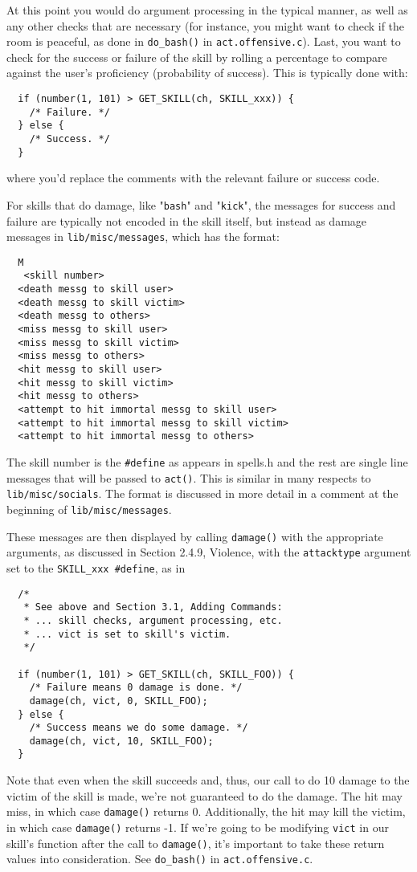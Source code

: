 \documentclass[11pt]{article}
\begin{document}
\par
At this point you would do argument processing in the typical manner, as well as any other checks that are necessary (for instance, you might want to check if the room is peaceful, as done in \texttt{do\_bash()} in \texttt{act.offensive.c}).  Last, you want to check for the success or failure of the skill by rolling a percentage to compare against the user's proficiency (probability of success).  This is typically done with:
\begin{verbatim}
  if (number(1, 101) > GET_SKILL(ch, SKILL_xxx)) {
    /* Failure. */
  } else {
    /* Success. */
  }
\end{verbatim}
where you'd replace the comments with the relevant failure or success code.
\par
For skills that do damage, like "\texttt{bash}" and "\texttt{kick}", the messages for success and failure are typically not encoded in the skill itself, but instead as damage messages in \texttt{lib/misc/messages}, which has the format:
\begin{verbatim}
  M
   <skill number>
  <death messg to skill user>
  <death messg to skill victim>
  <death messg to others>
  <miss messg to skill user>
  <miss messg to skill victim>
  <miss messg to others>
  <hit messg to skill user>
  <hit messg to skill victim>
  <hit messg to others>
  <attempt to hit immortal messg to skill user>
  <attempt to hit immortal messg to skill victim>
  <attempt to hit immortal messg to others>
\end{verbatim}
The skill number is the \texttt{\#define} as appears in spells.h and the rest are single line messages that will be passed to \texttt{act()}.  This is similar in many respects to \texttt{lib/misc/socials}.  The format is discussed in more detail in a comment at the beginning of \texttt{lib/misc/messages}.
\par
These messages are then displayed by calling \texttt{damage()} with the appropriate arguments, as discussed in Section 2.4.9, Violence, with the \texttt{attacktype} argument set to the \texttt{SKILL\_xxx \#define}, as in
\begin{verbatim}
  /*
   * See above and Section 3.1, Adding Commands:
   * ... skill checks, argument processing, etc.
   * ... vict is set to skill's victim.
   */

  if (number(1, 101) > GET_SKILL(ch, SKILL_FOO)) {
    /* Failure means 0 damage is done. */
    damage(ch, vict, 0, SKILL_FOO);
  } else {
    /* Success means we do some damage. */
    damage(ch, vict, 10, SKILL_FOO);
  }
\end{verbatim}
Note that even when the skill succeeds and, thus, our call to do 10 damage to the victim of the skill is made, we're not guaranteed to do the damage.  The hit may miss, in which case \texttt{damage()} returns 0.  Additionally, the hit may kill the victim, in which case \texttt{damage()} returns -1.  If we're going to be modifying \texttt{vict} in our skill's function after the call to \texttt{damage()}, it's important to take these return values into consideration.  See \texttt{do\_bash()} in \texttt{act.offensive.c}.
\end{document}

